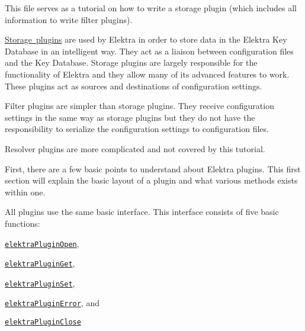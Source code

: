 This file serves as a tutorial on how to write a storage plugin (which includes all information to write filter plugins).


\begin{DoxyItemize}
\item \mbox{\hyperlink{doc_tutorials_storage-plugins_md}{Storage plugins}} are used by Elektra in order to store data in the Elektra Key Database in an intelligent way. They act as a liaison between configuration files and the Key Database. Storage plugins are largely responsible for the functionality of Elektra and they allow many of its advanced features to work. These plugins act as sources and destinations of configuration settings.
\item Filter plugins are simpler than storage plugins. They receive configuration settings in the same way as storage plugins but they do not have the responsibility to serialize the configuration settings to configuration files.
\item Resolver plugins are more complicated and not covered by this tutorial.
\end{DoxyItemize}

First, there are a few basic points to understand about Elektra plugins. This first section will explain the basic layout of a plugin and what various methods exists within one.

All plugins use the same basic interface. This interface consists of five basic functions\+:


\begin{DoxyItemize}
\item \href{https://doc.libelektra.org/api/current/html/group__plugin.html\#ga23c2eb3584e38a4d494eb8f91e5e3d8d}{\texttt{ {\ttfamily elektra\+Plugin\+Open}}},
\item \href{https://doc.libelektra.org/api/current/html/group__plugin.html\#gacb69f3441c6d84241b4362f958fbe313}{\texttt{ {\ttfamily elektra\+Plugin\+Get}}},
\item \href{https://doc.libelektra.org/api/current/html/group__plugin.html\#gae65781a1deb34efc79c8cb9d9174842c}{\texttt{ {\ttfamily elektra\+Plugin\+Set}}},
\item \href{https://doc.libelektra.org/api/current/html/group__plugin.html\#gad74b35f558ac7c3262f6069c5c47dc79}{\texttt{ {\ttfamily elektra\+Plugin\+Error}}}, and
\item \href{https://doc.libelektra.org/api/current/html/group__plugin.html\#ga1236aefe5b2baf8b7bf636ba5aa9ea29}{\texttt{ {\ttfamily elektra\+Plugin\+Close}}}
\end{DoxyItemize}

